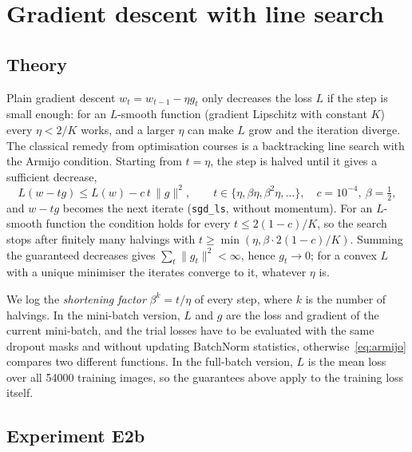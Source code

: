 \documentclass[11pt,a4paper]{article}
\newcommand{\1}{\mathbf{1}}
\begin{document}
\section{Gradient descent with line search}
\label{app:linesearch}
\label{sec:linesearch}

\subsection{Theory}
Plain gradient descent $w_{t} = w_{t-1} - \eta g_t$ only decreases the loss $L$ if the step is
small enough: for an $L$-smooth function (gradient Lipschitz with constant $K$) every
$\eta < 2/K$ works, and a larger $\eta$ can make $L$ grow and the iteration diverge. The
classical remedy from optimisation courses is a backtracking line search with the Armijo
condition. Starting from $t = \eta$, the step is halved until it gives a sufficient decrease,
\begin{equation}
  L(w - t g) \le L(w) - c\, t\, \lVert g \rVert^2, \qquad t \in \{\eta, \beta\eta, \beta^2\eta,
  \dots\}, \quad c = 10^{-4}, \ \beta = \tfrac12,
  \label{eq:armijo}
\end{equation}
and $w - t g$ becomes the next iterate (\texttt{sgd\_ls}, without momentum). For an $L$-smooth
function the condition holds for every $t \le 2(1 - c)/K$, so the search stops after finitely
many halvings with $t \ge \min(\eta, \beta \cdot 2(1-c)/K)$. Summing the guaranteed decreases
gives $\sum_t \lVert g_t \rVert^2 < \infty$, hence $g_t \to 0$; for a convex $L$ with a unique
minimiser the iterates converge to it, whatever $\eta$ is.

We log the \emph{shortening factor} $\beta^k = t/\eta$ of every step, where $k$ is the number of
halvings. In the mini-batch version, $L$ and $g$ are the loss and gradient of the current
mini-batch, and the trial losses have to be evaluated with the same dropout masks and without
updating BatchNorm statistics, otherwise~\eqref{eq:armijo} compares two different functions. In
the full-batch version, $L$ is the mean loss over all \num{54000} training images, so the
guarantees above apply to the training loss itself.

\subsection{Experiment E2b}
\end{document}
